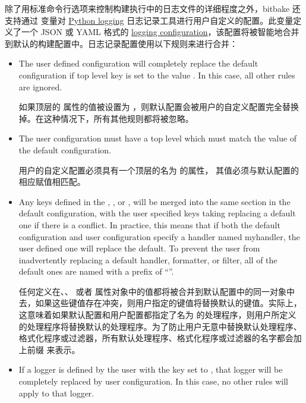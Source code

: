 除了用标准命令行选项来控制构建执行中的日志文件的详细程度之外，bitbake 还支持通过  变量对 \href{https://docs.python.org/3/library/logging.html}{Python logging} 日志记录工具进行用户自定义的配置。此变量定义了一个 JSON 或 YAML 格式的 \href{https://docs.python.org/3/library/logging.config.html}{logging configuration}，该配置将被智能地合并到默认的构建配置中。日志记录配置使用以下规则来进行合并：

\begin{itemize}
\setlength\itemsep{1.0em}
\item The user defined configuration will completely replace the default configuration if top level key  is set to the value . In this case, all other rules are ignored.\par

\medskip
如果顶层的  属性的值被设置为  ，则默认配置会被用户的自定义配置完全替换掉。在这种情况下，所有其他规则都将被忽略。

\item The user configuration must have a top level  which must match the value of the default configuration.

\medskip
用户的自定义配置必须具有一个顶层的名为  的属性， 其值必须与默认配置的相应赋值相匹配。

\item Any keys defined in the , , or , will be merged into the same section in the default configuration, with the user specified keys taking replacing a default one if there is a conflict. In practice, this means that if both the default configuration and user configuration specify a handler named myhandler, the user defined one will replace the default. To prevent the user from inadvertently replacing a default handler, formatter, or filter, all of the default ones are named with a prefix of ``''.

\medskip
任何定义在、、 或者  属性对象中的值都将被合并到默认配置中的同一对象中去，如果这些键值存在冲突，则用户指定的键值将替换默认的键值。实际上，这意味着如果默认配置和用户配置都指定了名为  的处理程序，则用户所定义的处理程序将替换默认的处理程序。为了防止用户无意中替换默认处理程序、格式化程序或过滤器，所有默认处理程序、格式化程序或过滤器的名字都会加上前缀  来表示。

\item If a logger is defined by the user with the key  set to , that logger will be completely replaced by user configuration. In this case, no other rules will apply to that logger.


\end{itemize}
